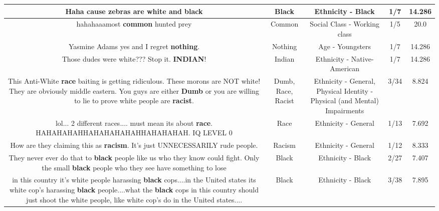 \documentclass[11pt]{article}
\newlength\mylength
\begin{document}
\begin{center}
\begin{longtable}{|C{.65\mylength}|C{.30\mylength}|C{.12\mylength}|C{.12\mylength}|C{.12\mylength}|}
  \small Haha cause zebras are white and black\normalsize   & Black & Ethnicity - Black & 1/7 & 14.286 \\  \hline
  \small hahahaaamost \textbf{common} hunted prey\normalsize   & Common & Social Class - Working class & 1/5 & 20.0 \\  \hline
  \small Yasmine Adams yes and I regret \textbf{nothing}.\normalsize   & Nothing & Age - Youngsters & 1/7 & 14.286 \\  \hline
  \small Those dudes were white??? Stop it. \textbf{INDIAN}!\normalsize   & Indian & Ethnicity - Native-American & 1/7 & 14.286 \\  \hline
  \small This Anti-White \textbf{race} baiting is getting ridiculous. These morons are NOT white! They are obviously middle eastern. You guys are either \textbf{Dumb} or you are willing to lie to prove white people are \textbf{racist}.\normalsize   & Dumb, Race, Racist & Ethnicity - General, Physical Identity - Physical (and Mental) Impairments & 3/34 & 8.824 \\  \hline
  \small lol... 2 different races.... must mean its about \textbf{race}. HAHAHAHAHHAHAHAHAHAHHAHAHAHAH.  IQ LEVEL 0\normalsize   & Race & Ethnicity - General & 1/13 & 7.692 \\  \hline
  \small How are they claiming this as \textbf{racism}. It's just UNNECESSARILY rude people.\normalsize   & Racism & Ethnicity - General & 1/12 & 8.333 \\  \hline
  \small They never ever do that to \textbf{black} people like us who they know could fight. Only the small \textbf{black} people who they see have something to lose\normalsize   & Black & Ethnicity - Black & 2/27 & 7.407 \\  \hline
  \small in this country it's white people harassing \textbf{black} cops....in the United states its white cop's harassing \textbf{black} people....what the \textbf{black} cops in this country should just shoot the white people, like white cop's do in the United states....\normalsize   & Black & Ethnicity - Black & 3/38 & 7.895 \\  \hline

\end{longtable}
\end{center}
\end{document}
